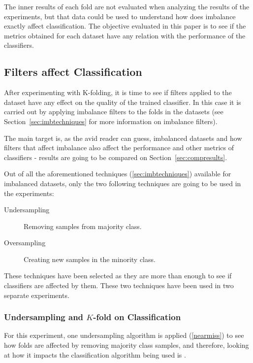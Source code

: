 The inner results of each fold are not evaluated when analyzing the results
of the experiments, but that data could be used to understand how does
imbalance exactly affect classification. The objective evaluated in this 
paper is to see if the metrics obtained for each dataset have any relation with 
the performance of the classifiers. 

\subsection{Filters affect Classification}

After experimenting with K-folding, it is time to see if filters applied to
the dataset have any effect on the quality of the trained classifier. In this 
case it is carried out by applying imbalance filters to the folds in the
datasets (see Section~\ref{sec:imbtechniques} for more information on 
imbalance filters).

The main target is, as the avid reader can guess, imbalanced datasets and how
filters that affect imbalance also affect the performance and other metrics of 
classifiers - results are going to be compared on Section~\ref{sec:compresults}.

Out of all the aforementioned techniques (\ref{sec:imbtechniques}) available 
for imbalanced datasets, only the two following techniques are going to be used 
in the experiments:

\begin{description}
    \item [Undersampling] Removing samples from majority class.
    \item [Oversampling] Creating new samples in the minority class.
\end{description}

These techniques have been selected as they are more than enough to see if
classifiers are affected by them. These two techniques have been used in two 
separate experiments.

\subsubsection{Undersampling and $K$-fold on Classification}
\label{sec:kfoldunder}

For this experiment, one undersampling algorithm is applied 
(\ref{nearmiss}) to see how folds are affected by removing majority class
samples, and therefore, looking at how it impacts the classification algorithm 
being used is . 


